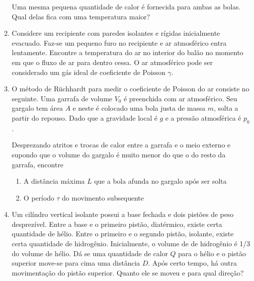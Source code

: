 \documentclass[a4paper, 12pt]{article}
\theoremstyle{definition}
\theoremstyle{definition}
\begin{document}
\begin{enumerate}
    Uma mesma pequena quantidade de calor é fornecida para ambas as bolas. Qual delas fica com uma temperatura
    maior?
    \item Considere um recipiente com paredes isolantes e rígidas inicialmente evacuado. Faz-se um pequeno
    furo no recipiente e ar atmosférico entra lentamente. Encontre a temperatura do ar no interior do balão
    no momento em que o fluxo de ar para dentro cessa. O ar atmosférico pode ser considerado um gás ideal
    de coeficiente de Poisson $\gamma$.
    \item O método de Rüchhardt para medir o coeficiente de Poisson do ar consiste no seguinte. Uma garrafa
    de volume $V_0$ é preenchida com ar atmosférico. Seu gargalo tem área $A$ e neste é colocado uma bola justa
    de massa $m$, solta a partir do repouso. Dado que a gravidade local é $g$ e a pressão atmosférica é $p_0$.
    \begin{figure}[h]
        \centering
    \end{figure}

    Desprezando atritos e trocas de calor entre a garrafa e o meio externo e supondo que o volume do gargalo
    é muito menor do que o do resto da garrafa, encontre
    \begin{enumerate}
        \item A distância máxima $L$ que a bola afunda no gargalo após ser solta
        \item O período $\tau$ do movimento subsequente
    \end{enumerate}
    \item Um cilíndro vertical isolante possui a base fechada e dois pistões de peso desprezível. Entre a base 
    e o primeiro pistão, diatérmico, existe certa quantidade de hélio. Entre o primeiro e o segundo pistão, 
    isolante, existe certa quantidade de hidrogênio. Inicialmente, o volume de de hidrogênio é 1/3 do volume
    de hélio. Dá se uma quantidade de calor $Q$ para o hélio e o pistão superior move-se para cima uma distância
    $D$. Após certo tempo, há outra movimentação do pistão superior. Quanto ele se moveu e para qual direção?
\end{enumerate}
\end{document}
